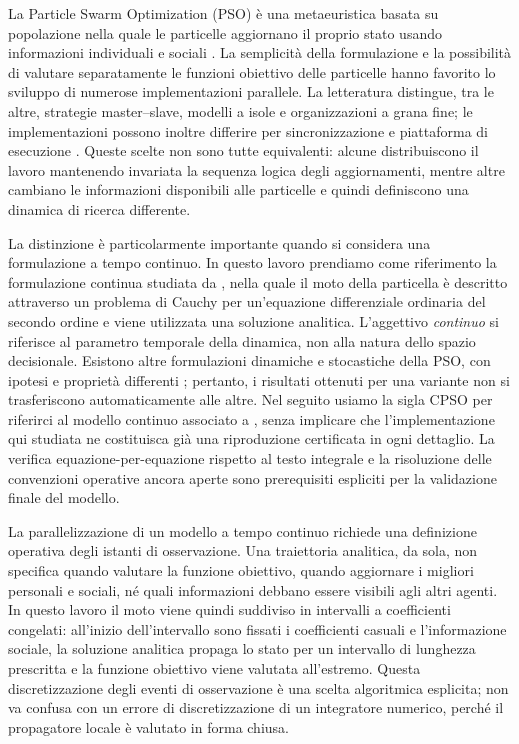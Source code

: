 La Particle Swarm Optimization (PSO) è una metaeuristica basata su popolazione nella quale le particelle aggiornano il proprio stato usando informazioni individuali e sociali \citep{Kennedy1995}. La semplicità della formulazione e la possibilità di valutare separatamente le funzioni obiettivo delle particelle hanno favorito lo sviluppo di numerose implementazioni parallele. La letteratura distingue, tra le altre, strategie master--slave, modelli a isole e organizzazioni a grana fine; le implementazioni possono inoltre differire per sincronizzazione e piattaforma di esecuzione \citep{Alba2002,CantuPaz2001,Lalwani2019}. Queste scelte non sono tutte equivalenti: alcune distribuiscono il lavoro mantenendo invariata la sequenza logica degli aggiornamenti, mentre altre cambiano le informazioni disponibili alle particelle e quindi definiscono una dinamica di ricerca differente.

La distinzione è particolarmente importante quando si considera una formulazione a tempo continuo. In questo lavoro prendiamo come riferimento la formulazione continua studiata da \citet{Orlando2021}, nella quale il moto della particella è descritto attraverso un problema di Cauchy per un'equazione differenziale ordinaria del secondo ordine e viene utilizzata una soluzione analitica. L'aggettivo \emph{continuo} si riferisce al parametro temporale della dinamica, non alla natura dello spazio decisionale. Esistono altre formulazioni dinamiche e stocastiche della PSO, con ipotesi e proprietà differenti \citep{Clerc2002,Emara2004,Huang2023}; pertanto, i risultati ottenuti per una variante non si trasferiscono automaticamente alle altre. Nel seguito usiamo la sigla CPSO per riferirci al modello continuo associato a \citet{Orlando2021}, senza implicare che l'implementazione qui studiata ne costituisca già una riproduzione certificata in ogni dettaglio. La verifica equazione-per-equazione rispetto al testo integrale e la risoluzione delle convenzioni operative ancora aperte sono prerequisiti espliciti per la validazione finale del modello.

La parallelizzazione di un modello a tempo continuo richiede una definizione operativa degli istanti di osservazione. Una traiettoria analitica, da sola, non specifica quando valutare la funzione obiettivo, quando aggiornare i migliori personali e sociali, né quali informazioni debbano essere visibili agli altri agenti. In questo lavoro il moto viene quindi suddiviso in intervalli a coefficienti congelati: all'inizio dell'intervallo sono fissati i coefficienti casuali e l'informazione sociale, la soluzione analitica propaga lo stato per un intervallo di lunghezza prescritta e la funzione obiettivo viene valutata all'estremo. Questa discretizzazione degli eventi di osservazione è una scelta algoritmica esplicita; non va confusa con un errore di discretizzazione di un integratore numerico, perché il propagatore locale è valutato in forma chiusa.


